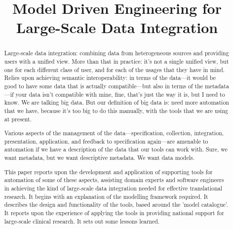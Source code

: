\documentclass[conference]{IEEEtran}
\begin{document}
 

\title{Model Driven Engineering for \\ Large-Scale Data Integration}

\vskip 4mm 

\author{%
}

\ifpdf
\graphicspath{{ASEFigs/}}
\fi

\maketitle

\begin{abstract}
  Large-scale data integration: combining data from heterogeneous
  sources and providing users with a unified view.  More than that in
  practice: it's not a single unified view, but one for each different
  class of user, and for each of the usages that they have in mind.
  Relies upon achieving semantic interoperability: in terms of the
  data---it would be good to have some data that is actually
  compatible---but also in terms of the metadata---if your data isn't
  compatible with mine, fine, that's just the way it is, but I need to
  know.  We are talking big data.  But our definition of big data is:
  need more automation that we have, because it's too big to do this
  manually, with the tools that we are using at present.  

  Various aspects of the management of the data---specification,
  collection, integration, presentation, application, and feedback to
  specification again---are amenable to automation if we have a
  description of the data that our tools can work with.  Sure, we want
  metadata, but we want descriptive metadata.  We want data models.  

  This paper reports upon the development and application of
  supporting tools for automation of some of these aspects, assisting
  domain experts and software engineers in achieving the kind of
  large-scale data integration needed for effective translational
  research.  It begins with an explanation of the modelling framework
  required.  It describes the design and functionality of the tools,
  based around the 'model catalogue'.  It reports upon the experience
  of applying the tools in providing national support for large-scale
  clinical research.  It sets out some lessons learned. 
\end{abstract}

\vskip 14mm

\noindent






 


\newpage




\end{document}
